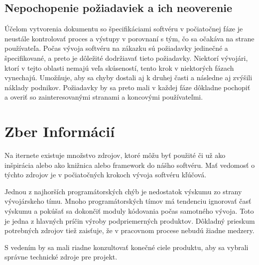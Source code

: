 \documentclass[10pt,twoside,slovak,a4paper]{article}
\begin{document}
\subsection{Nepochopenie požiadaviek a ich neoverenie}

Účelom vytvorenia dokumentu so špecifikáciami softvéru v počiatočnej fáze je neustále kontrolovať proces a výstupy v porovnaní s tým, čo sa očakáva na strane používateľa. Počas vývoja softvéru na zákazku sú požiadavky jedinečné a špecifikované, a preto je dôležité dodržiavať tieto požiadavky. Niektorí vývojári, ktorí v tejto oblasti nemajú veľa skúseností, tento krok v niektorých fázach vynechajú. Umožňuje, aby sa chyby dostali aj k druhej časti a následne aj zvýšili náklady podnikov. Požiadavky by sa preto mali v každej fáze dôkladne pochopiť a overiť so zainteresovanými stranami a koncovými používateľmi.











\section{Zber Informácií}

Na iternete existuje množstvo zdrojov, ktoré môžu byť použité či už ako inšpirácia alebo ako knižnica alebo framework do nášho softvéru.
Mať vedomosť o týchto zdrojov je v počiatočných krokoch vývoja softvéru kľúčová. 



Jednou z najhorších programátorských chýb je nedostatok výskumu zo strany vývojárskeho tímu. Mnoho programátorských tímov má tendenciu ignorovať časť výskumu a pokúšať sa dokončiť moduly kódovania počas samotného vývoja. Toto je jedna z hlavných príčin výroby podpriemerných produktov. Dôkladný prieskum potrebných zdrojov tiež zaisťuje, že v pracovnom procese nebudú žiadne medzery.

S vedením by sa mali riadne konzultovať konečné ciele produktu, aby sa vybrali správne technické zdroje pre projekt.
\end{document}
